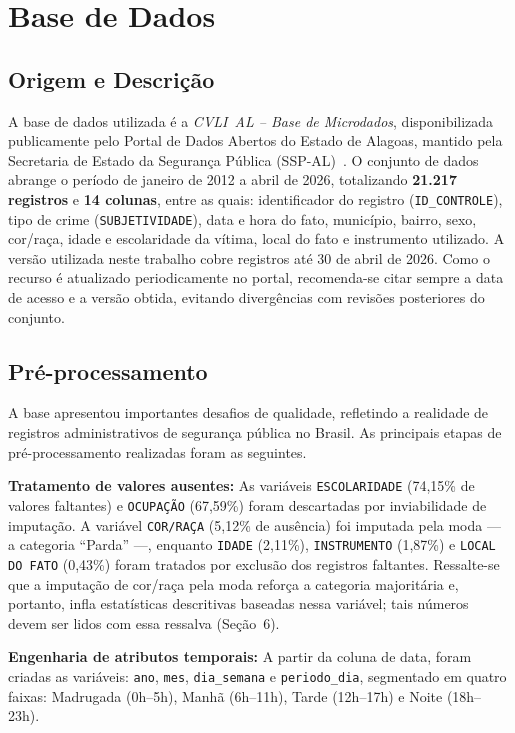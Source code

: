 \documentclass[12pt]{article}
\begin{document}
\section{Base de Dados}
\subsection{Origem e Descrição}
A base de dados utilizada é a \textit{CVLI~AL -- Base de Microdados},
disponibilizada publicamente pelo Portal de Dados Abertos do Estado de
Alagoas, mantido pela Secretaria de Estado da Segurança Pública
(SSP-AL)~\cite{sspAL:2024}. O conjunto de dados abrange o período de
janeiro de 2012 a abril de 2026, totalizando \textbf{21.217 registros} e
\textbf{14 colunas}, entre as quais: identificador do registro
(\texttt{ID\_CONTROLE}), tipo de crime (\texttt{SUBJETIVIDADE}), data e
hora do fato, município, bairro, sexo, cor/raça, idade e escolaridade da
vítima, local do fato e instrumento utilizado. A versão utilizada neste
trabalho cobre registros até 30 de abril de 2026. Como o recurso é
atualizado periodicamente no portal, recomenda-se citar sempre a data de
acesso e a versão obtida, evitando divergências com revisões posteriores
do conjunto.

\subsection{Pré-processamento}
A base apresentou importantes desafios de qualidade, refletindo a realidade
de registros administrativos de segurança pública no Brasil. As principais
etapas de pré-processamento realizadas foram as seguintes.

\textbf{Tratamento de valores ausentes:} As variáveis \texttt{ESCOLARIDADE}
(74,15\% de valores faltantes) e \texttt{OCUPAÇÃO} (67,59\%) foram descartadas
por inviabilidade de imputação. A variável \texttt{COR/RAÇA} (5,12\% de
ausência) foi imputada pela moda --- a categoria ``Parda'' ---, enquanto
\texttt{IDADE} (2,11\%), \texttt{INSTRUMENTO} (1,87\%) e \texttt{LOCAL DO
FATO} (0,43\%) foram tratados por exclusão dos registros faltantes. Ressalte-se
que a imputação de cor/raça pela moda reforça a categoria majoritária e,
portanto, infla estatísticas descritivas baseadas nessa variável; tais
números devem ser lidos com essa ressalva (Seção~6).

\textbf{Engenharia de atributos temporais:} A partir da coluna de data, foram
criadas as variáveis: \texttt{ano}, \texttt{mes}, \texttt{dia\_semana} e
\texttt{periodo\_dia}, segmentado em quatro faixas: Madrugada (0h--5h),
Manhã (6h--11h), Tarde (12h--17h) e Noite (18h--23h).
\end{document}
